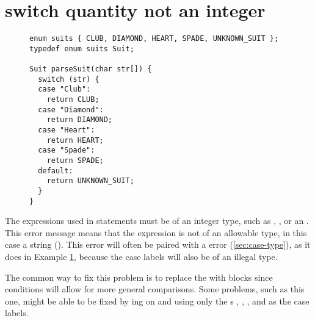 \section{switch quantity not an integer}\label{sec:switch-type}

\begin{figure}[htb]
\begin{lstlisting}
enum suits { CLUB, DIAMOND, HEART, SPADE, UNKNOWN_SUIT };
typedef enum suits Suit;

Suit parseSuit(char str[]) {
  switch (str) {
  case "Club":
    return CLUB;
  case "Diamond":
    return DIAMOND;
  case "Heart":
    return HEART;
  case "Spade":
    return SPADE;
  default:
    return UNKNOWN_SUIT;
  }
}
\end{lstlisting}
\label{ex:switch-type}
\end{figure}

The expressions used in  statements must be of an integer type, such as , , or an .
This error message means that the expression is not of an allowable type, in this case a string ().
This error will often be paired with a  error (\ref{sec:case-type}), as it does in Example \ref{ex:switch-type}, because the case labels will also be of an illegal type.

The common way to fix this problem is to replace the  with  blocks since  conditions will allow for more general comparisons.
Some problems, such as this one, might be able to be fixed by ing on  and using only the s , , , and  as the case labels.
\newpage